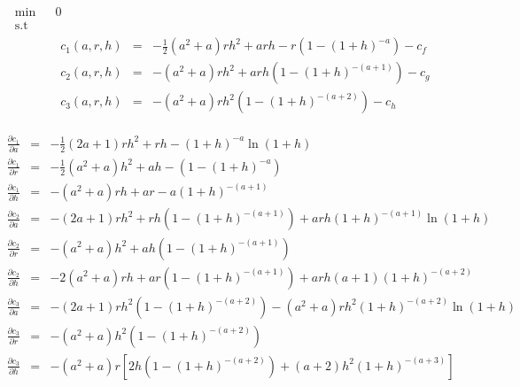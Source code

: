 \documentclass[a4paper,12pt]{article}
\newcommand{\dpart}[2]{\frac{\partial #1}{\partial #2}}
\newcommand{\meio}{\frac{1}{2}}
\begin{document}
\begin{eqnarray*}
  \min & & 0 \\
  \mbox{s.t} & &\\
             & & \begin{array}{rcl}
  c_1(a,r,h) &=& -\meio(a^2+a)rh^2+arh-r(1-(1+h)^{-a}) - c_f \\
  c_2(a,r,h) &=& -(a^2+a)rh^2+arh(1-(1+h)^{-(a+1)}) - c_g \\
  c_3(a,r,h) &=& -(a^2+a)rh^2(1-(1+h)^{-(a+2)}) - c_h
  \end{array}
\end{eqnarray*}

\begin{eqnarray*}
  \dpart{c_1}{a} &=& -\meio(2a+1)rh^2 + rh - (1+h)^{-a}\ln (1+h) \\
  \dpart{c_1}{r} &=& -\meio(a^2+a)h^2 + ah - (1 - (1+h)^{-a}) \\
  \dpart{c_1}{h} &=& -(a^2+a)rh + ar - a(1+h)^{-(a+1)} \\
  \dpart{c_2}{a} &=& -(2a+1)rh^2+rh(1-(1+h)^{-(a+1)}) +
    arh(1+h)^{-(a+1)}\ln(1+h) \\
  \dpart{c_2}{r} &=& -(a^2+a)h^2+ah(1-(1+h)^{-(a+1)}) \\
  \dpart{c_2}{h} &=& -2(a^2+a)rh+ar(1-(1+h)^{-(a+1)}) + arh(a+1)(1+h)^{-(a+2)}
    \\
  \dpart{c_3}{a} &=& -(2a+1)rh^2(1-(1+h)^{-(a+2)}) -
    (a^2+a)rh^2(1+h)^{-(a+2)}\ln(1+h) \\
  \dpart{c_3}{r} &=& -(a^2+a)h^2(1-(1+h)^{-(a+2)}) \\
  \dpart{c_3}{h} &=& -(a^2+a)r[2h(1-(1+h)^{-(a+2)}) + (a+2)h^2(1+h)^{-(a+3)}] \\
\end{eqnarray*}
\end{document}
